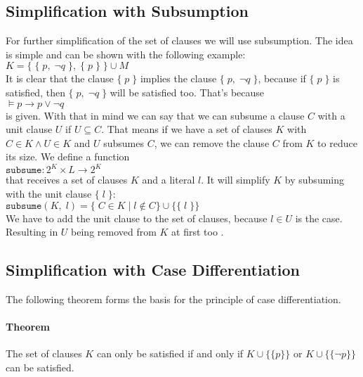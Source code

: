\subsection{Simplification with Subsumption}
\label{sub:sciDavisPutnamSubsumption}
For further simplification of the set of clauses we will use subsumption. The idea is simple and can be shown with the following example:
\\[0.2cm]
\hspace*{1.3cm} $K = \{\; \{\; p,\; \neg q \;\},\; \{\; p\; \}\; \} \cup M$
\\[0.2cm]
It is clear that the clause $\{\; p\; \}$ implies the clause $\{\; p,\; \neg q \;\}$, because if $\{\; p\; \}$ is satisfied, then $\{\; p,\; \neg q \;\}$ will be satisfied too. That's because
\\[0.2cm]
\hspace*{1.3cm} $\models p \to p \lor \neg q$
\\[0.2cm]
is given. With that in mind we can say that we can subsume a clause $C$ with a unit clause $U$ if $U \subseteq C$. That means if we have a set of clauses $K$ with $C \in K \land U \in K$ and $U$ subsumes $C$, we can remove the clause $C$ from $K$ to reduce its size. We define a function
\\[0.2cm]
\hspace*{1.3cm} $\texttt{subsume}: 2^{K} \times L \to 2^{K}$
\\[0.2cm]
that receives a set of clauses $K$ and a literal $l$. It will simplify $K$ by subsuming with the unit clause $\{\; l\; \}$:
\\[0.2cm]
\hspace*{1.3cm} $\texttt{subsume}(K,\; l) = \{\; C \in K\; |\; l \notin C\} \cup \{\{\; l\; \}\}$
\\[0.2cm]
We have to add the unit clause to the set of clauses, because $l \in U$ is the case. Resulting in $U$ being removed from $K$ at first too \cite{Stroetman2019}. 

\subsection{Simplification with Case Differentiation}
\label{sub:sciDavisPutnamCaseDiv}
The following theorem forms the basis for the principle of case differentiation.

\paragraph{Theorem}
The set of clauses $K$ can only be satisfied if and only if $K \cup \bigl\{\{p\}\bigr\}$ or $K \cup \bigl\{\{\neg p\}\bigr\}$ can be satisfied.

